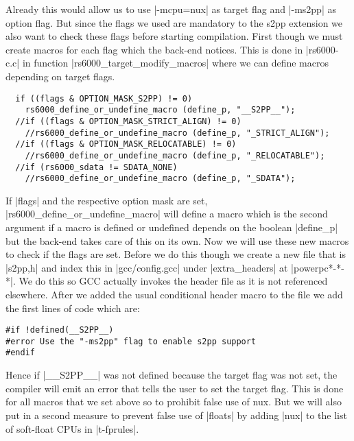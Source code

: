 Already this would allow us to use |-mcpu=nux| as target flag and |-ms2pp| as option flag.
But since the flags we used are mandatory to the s2pp extension we also want to check these flags before starting compilation.
First though we must create macros for each flag which the back-end notices.
This is done in |rs6000-c.c| in function |rs6000_target_modify_macros| where we can define macros depending on target flags.
\begin{lstlisting}
  if ((flags & OPTION_MASK_S2PP) != 0)
    rs6000_define_or_undefine_macro (define_p, "__S2PP__");
  //if ((flags & OPTION_MASK_STRICT_ALIGN) != 0)
    //rs6000_define_or_undefine_macro (define_p, "_STRICT_ALIGN");
  //if ((flags & OPTION_MASK_RELOCATABLE) != 0)
    //rs6000_define_or_undefine_macro (define_p, "_RELOCATABLE");
  //if (rs6000_sdata != SDATA_NONE)
    //rs6000_define_or_undefine_macro (define_p, "_SDATA");
\end{lstlisting}

If |flags| and the respective option mask are set, |rs6000_define_or_undefine_macro| will define a macro which is the second argument if a macro is defined or undefined depends on the boolean |define_p| but the back-end takes care of this on its own.
Now we will use these new macros to check if the flags are set.
Before we do this though we create a new file that is |s2pp,h| and index this in |gcc/config.gcc| under |extra_headers| at |powerpc*-*-*|.
We do this so GCC actually invokes the header file as it is not referenced elsewhere.
After we added the usual conditional header macro to the file we add the first lines of code which are:
\begin{lstlisting}
#if !defined(__S2PP__)
#error Use the "-ms2pp" flag to enable s2pp support
#endif
\end{lstlisting}
Hence if |__S2PP__| was not defined because the target flag was not set, the compiler will emit an error that tells the user to set the target flag.
This is done for all macros that we set above so to prohibit false use of nux.
But we will also put in a second measure to prevent false use of |floats| by adding |nux| to the list of soft-float CPUs in |t-fprules|.

